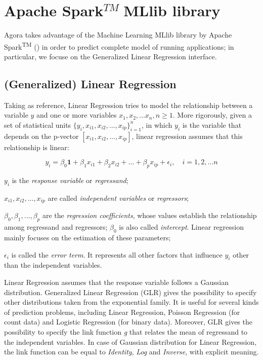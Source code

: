 \section{Apache Spark\texorpdfstring{$^{TM}\;$}MMLlib library}

Agora takes advantage of the Machine Learning MLlib library by Apache Spark\textsuperscript{TM} (\cite{spark2015apache}) in order to predict complete model of running applications; in particular, we focuse on the Generalized Linear Regression interface.


\subsection{(Generalized) Linear Regression}\label{glr}

Taking \cite{site:caltechML2012} as reference, Linear Regression tries to model the relationship between a variable $y$ and one or more variables $x_1,x_2,...x_n,n\ge1$. More rigorously, given a set of statistical units $\{y_i,x_{i1},x_{i2},...,x_{ip}\}_{i = 1}^n$, in which $y_i$ is the variable that depends on the p-vector $[x_{i1}, x_{i2}, ..., x_{ip}]$, linear regression assumes that this relationship is linear:

\begin{equation}
    y_i = \beta_0\boldsymbol{1} + \beta_1x_{i1} + \beta_2x_{i2} + ... +  \beta_px_{ip} + \epsilon_i, \quad i = 1, 2, ... n
\end{equation}

$y_i$ is the \textit{response variable} or \textit{regressand};

$x_{i1}, x_{i2}, ..., x_{ip}$ are called \textit{independent variables} or \textit{regressors};

$\beta_0, \beta_1, ..., \beta_p$ are the \textit{regression coefficients}, whose values establish the relationship among regressand and regressors; $\beta_0$ is also called \textit{intercept}. Linear regression mainly focuses on the estimation of these parameters;

$\epsilon_i$ is called the \textit{error term}. It represents all other factors that influence $y_i$ other than the independent variables.

Linear Regression assumes that the response variable follows a Gaussian distribution. Generalized Linear Regression (GLR) gives the possibility to specify other distributions taken from the exponential family. It is useful for several kinds of prediction problems, including Linear Regression, Poisson Regression (for count data) and Logistic Regression (for binary data). Moreover, GLR gives the possibility to specify the link function \textit{g} that relates the mean of regressand to the independent variables. In case of Gaussian distribution for Linear Regression, the link function can be equal to \textit{Identity}, \textit{Log} and \textit{Inverse}, with explicit meaning.


